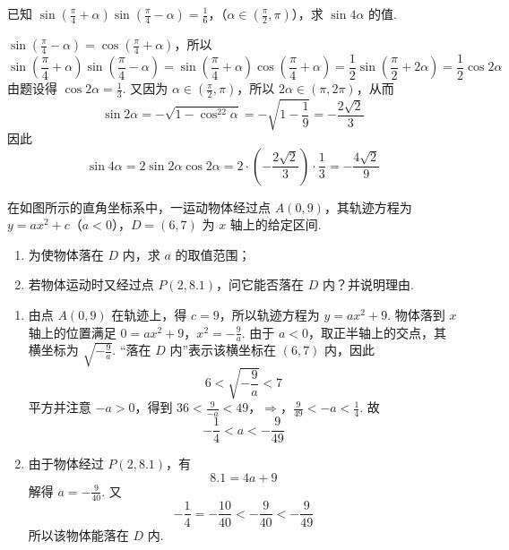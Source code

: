 \documentclass[UTF8,a4paper,oneside,11pt]{ctexbook}
\begin{document}
\begin{problem}
已知 \(\sin\left(\frac{\pi}{4}+\alpha\right)\sin\left(\frac{\pi}{4}-\alpha\right)=\frac{1}{6}\)，（\(\alpha\in\left(\frac{\pi}{2},\pi\right)\)），求 \(\sin 4\alpha\) 的值.
\end{problem}

\begin{solution}
\(\sin\left(\frac{\pi}{4}-\alpha\right)=\cos\left(\frac{\pi}{4}+\alpha\right)\)，所以
\[
\sin\left(\frac{\pi}{4}+\alpha\right)\sin\left(\frac{\pi}{4}-\alpha\right)
=\sin\left(\frac{\pi}{4}+\alpha\right)\cos\left(\frac{\pi}{4}+\alpha\right)
=\frac{1}{2}\sin\left(\frac{\pi}{2}+2\alpha\right)
=\frac{1}{2}\cos2\alpha
\]
由题设得 \(\cos2\alpha=\frac{1}{3}\). 又因为 \(\alpha\in\left(\frac{\pi}{2},\pi\right)\)，所以 \(2\alpha\in(\pi,2\pi)\)，从而
\[
\sin2\alpha=-\sqrt{1-\cos^22\alpha}
=-\sqrt{1-\frac{1}{9}}
=-\frac{2\sqrt{2}}{3}
\]
因此
\[
\sin4\alpha=2\sin2\alpha\cos2\alpha
=2\cdot\left(-\frac{2\sqrt{2}}{3}\right)\cdot\frac{1}{3}
=-\frac{4\sqrt{2}}{9}
\]
\end{solution}

\begin{problem}
在如图所示的直角坐标系中，一运动物体经过点 \(A(0,9)\)，其轨迹方程为 \(y=ax^2+c\)（\(a<0\)），\(D=(6,7)\) 为 \(x\) 轴上的给定区间.

\begin{enumerate}
\item 为使物体落在 \(D\) 内，求 \(a\) 的取值范围；
\item 若物体运动时又经过点 \(P(2,8.1)\)，问它能否落在 \(D\) 内？并说明理由.
\end{enumerate}

\end{problem}

\begin{solution}
\begin{enumerate}
\item 由点 \(A(0,9)\) 在轨迹上，得 \(c=9\)，所以轨迹方程为 \(y=ax^2+9\). 物体落到 \(x\) 轴上的位置满足
\(0=ax^2+9\)，\(x^2=-\frac{9}{a}\).
由于 \(a<0\)，取正半轴上的交点，其横坐标为 \(\sqrt{-\frac{9}{a}}\). “落在 \(D\) 内”表示该横坐标在 \((6,7)\) 内，因此
\[
6<\sqrt{-\frac{9}{a}}<7
\]
平方并注意 \(-a>0\)，得到
\(36<\frac{9}{-a}<49\)，\(\Longrightarrow\)，\(\frac{9}{49}<-a<\frac{1}{4}\).
故
\[
-\frac{1}{4}<a<-\frac{9}{49}
\]

\item 由于物体经过 \(P(2,8.1)\)，有
\[
8.1=4a+9
\]
解得 \(a=-\frac{9}{40}\). 又
\[
-\frac{1}{4}=-\frac{10}{40}<-\frac{9}{40}<-\frac{9}{49}
\]
所以该物体能落在 \(D\) 内.
\end{enumerate}
\end{solution}
\end{document}
